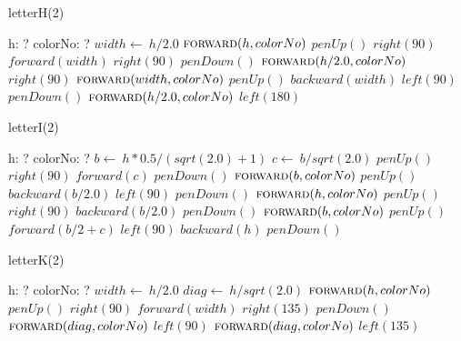 \documentclass[a4paper,10pt]{article}
\begin{document}
\begin{algorithm}
\caption{letterH(2)}
\begin{algorithmic}[5]
\State {}
\State {}
    \State h: ?
    \State colorNo: ?
  \EndDecl
  \State \(width\gets\ h/2.0\)
  \State \(\Call{forward}{h,colorNo}\)
  \State \(penUp()\)
  \State \(right(90)\)
  \State \(forward(width)\)
  \State \(right(90)\)
  \State \(penDown()\)
  \State \(\Call{forward}{h/2.0,colorNo}\)
  \State \(right(90)\)
  \State \(\Call{forward}{width,colorNo}\)
  \State \(penUp()\)
  \State \(backward(width)\)
  \State \(left(90)\)
  \State \(penDown()\)
  \State \(\Call{forward}{h/2.0,colorNo}\)
  \State \(left(180)\)
\EndProcedure
\end{algorithmic}
\end{algorithm}


\begin{algorithm}
\caption{letterI(2)}
\begin{algorithmic}[5]
\State {}
\State {}
    \State h: ?
    \State colorNo: ?
  \EndDecl
  \State \(b\gets\ h*0.5/(sqrt(2.0)+1)\)
  \State \(c\gets\ b/sqrt(2.0)\)
  \State \(penUp()\)
  \State \(right(90)\)
  \State \(forward(c)\)
  \State \(penDown()\)
  \State \(\Call{forward}{b,colorNo}\)
  \State \(penUp()\)
  \State \(backward(b/2.0)\)
  \State \(left(90)\)
  \State \(penDown()\)
  \State \(\Call{forward}{h,colorNo}\)
  \State \(penUp()\)
  \State \(right(90)\)
  \State \(backward(b/2.0)\)
  \State \(penDown()\)
  \State \(\Call{forward}{b,colorNo}\)
  \State \(penUp()\)
  \State \(forward(b/2+c)\)
  \State \(left(90)\)
  \State \(backward(h)\)
  \State \(penDown()\)
\EndProcedure
\end{algorithmic}
\end{algorithm}


\begin{algorithm}
\caption{letterK(2)}
\begin{algorithmic}[5]
\State {}
\State {}
    \State h: ?
    \State colorNo: ?
  \EndDecl
  \State \(width\gets\ h/2.0\)
  \State \(diag\gets\ h/sqrt(2.0)\)
  \State \(\Call{forward}{h,colorNo}\)
  \State \(penUp()\)
  \State \(right(90)\)
  \State \(forward(width)\)
  \State \(right(135)\)
  \State \(penDown()\)
  \State \(\Call{forward}{diag,colorNo}\)
  \State \(left(90)\)
  \State \(\Call{forward}{diag,colorNo}\)
  \State \(left(135)\)
\EndProcedure
\end{algorithmic}
\end{algorithm}
\end{document}
